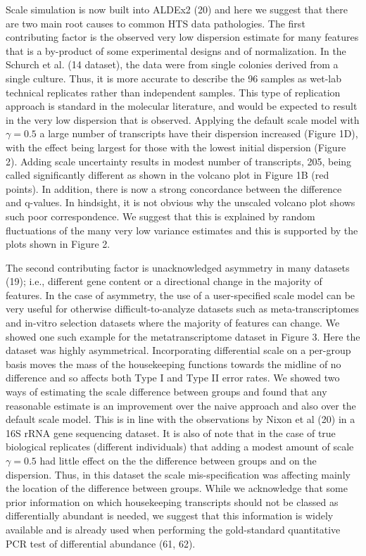 \documentclass[
]{article}
\begin{document}
Scale simulation is now built into ALDEx2 (20) and here we suggest that
there are two main root causes to common HTS data pathologies. The first
contributing factor is the observed very low dispersion estimate for
many features that is a by-product of some experimental designs and of
normalization. In the Schurch et al. (14 dataset), the data were from
single colonies derived from a single culture. Thus, it is more accurate
to describe the 96 samples as wet-lab technical replicates rather than
independent samples. This type of replication approach is standard in
the molecular literature, and would be expected to result in the very
low dispersion that is observed. Applying the default scale model with
\(\gamma=0.5\) a large number of transcripts have their dispersion
increased (Figure 1D), with the effect being largest for those with the
lowest initial dispersion (Figure 2). Adding scale uncertainty results
in modest number of transcripts, 205, being called significantly
different as shown in the volcano plot in Figure 1B (red points). In
addition, there is now a strong concordance between the difference and
q-values. In hindsight, it is not obvious why the unscaled volcano plot
shows such poor correspondence. We suggest that this is explained by
random fluctuations of the many very low variance estimates and this is
supported by the plots shown in Figure 2.

The second contributing factor is unacknowledged asymmetry in many
datasets (19); i.e., different gene content or a directional change in
the majority of features. In the case of asymmetry, the use of a
user-specified scale model can be very useful for otherwise
difficult-to-analyze datasets such as meta-transcriptomes and in-vitro
selection datasets where the majority of features can change. We showed
one such example for the metatranscriptome dataset in Figure 3. Here the
dataset was highly asymmetrical. Incorporating differential scale on a
per-group basis moves the mass of the housekeeping functions towards the
midline of no difference and so affects both Type I and Type II error
rates. We showed two ways of estimating the scale difference between
groups and found that any reasonable estimate is an improvement over the
naive approach and also over the default scale model. This is in line
with the observations by Nixon et al (20) in a 16S rRNA gene sequencing
dataset. It is also of note that in the case of true biological
replicates (different individuals) that adding a modest amount of scale
\(\gamma=0.5\) had little effect on the the difference between groups
and on the dispersion. Thus, in this dataset the scale mis-specification
was affecting mainly the location of the difference between groups.
While we acknowledge that some prior information on which housekeeping
transcripts should not be classed as differentially abundant is needed,
we suggest that this information is widely available and is already used
when performing the gold-standard quantitative PCR test of differential
abundance (61, 62).
\end{document}
